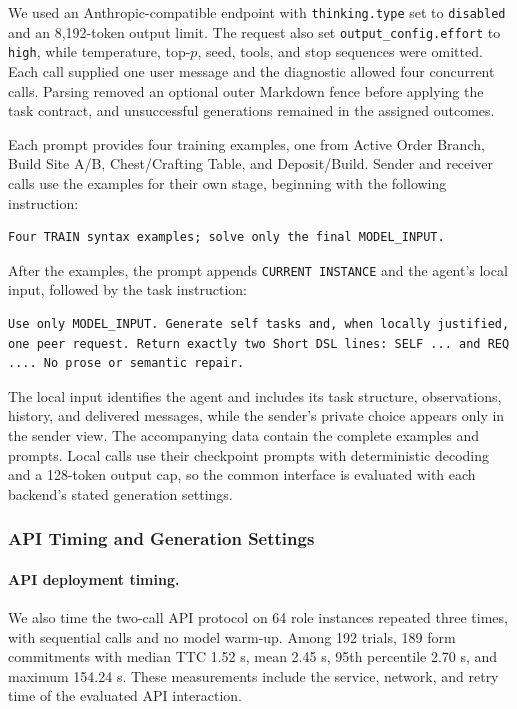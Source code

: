 \documentclass[sigconf,nonacm,balance=false]{aamas}
\begin{document}
We used an Anthropic-compatible endpoint with \texttt{thinking.type} set to \texttt{disabled} and an 8,192-token output limit. The request also set \texttt{output\_config.effort} to \texttt{high}, while temperature, top-$p$, seed, tools, and stop sequences were omitted. Each call supplied one user message and the diagnostic allowed four concurrent calls. Parsing removed an optional outer Markdown fence before applying the task contract, and unsuccessful generations remained in the assigned outcomes.

Each prompt provides four training examples, one from Active Order Branch, Build Site A/B, Chest/Crafting Table, and Deposit/Build. Sender and receiver calls use the examples for their own stage, beginning with the following instruction:
\begin{lstlisting}[style=gcpdsl]
Four TRAIN syntax examples; solve only the final MODEL_INPUT.
\end{lstlisting}
After the examples, the prompt appends \texttt{CURRENT INSTANCE} and the agent's local input, followed by the task instruction:
\begin{lstlisting}[style=gcpdsl]
Use only MODEL_INPUT. Generate self tasks and, when locally justified, one peer request. Return exactly two Short DSL lines: SELF ... and REQ .... No prose or semantic repair.
\end{lstlisting}
The local input identifies the agent and includes its task structure, observations, history, and delivered messages, while the sender's private choice appears only in the sender view. The accompanying data contain the complete examples and prompts. Local calls use their checkpoint prompts with deterministic decoding and a 128-token output cap, so the common interface is evaluated with each backend's stated generation settings.

\subsubsection{API Timing and Generation Settings}

\paragraph{API deployment timing.}
We also time the two-call API protocol on 64 role instances repeated three times, with sequential calls and no model warm-up. Among 192 trials, 189 form commitments with median TTC 1.52 s, mean 2.45 s, 95th percentile 2.70 s, and maximum 154.24 s. These measurements include the service, network, and retry time of the evaluated API interaction.
\end{document}
